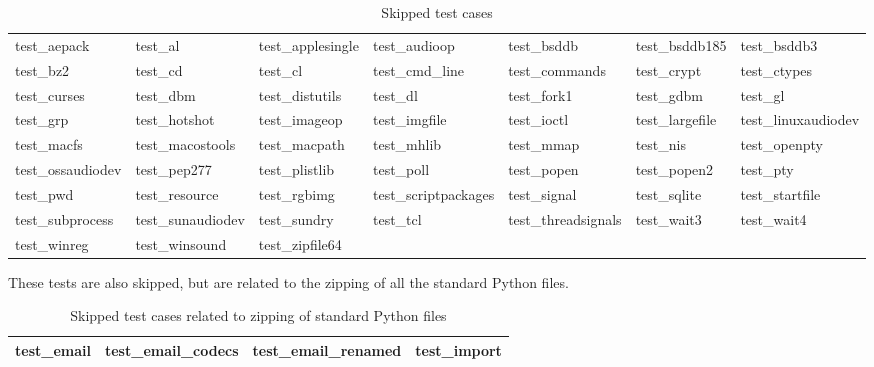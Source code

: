 \begin{table}[htbp]
\begin{center}
\begin{tabular}{l|l|l|l|l|l|l}
\hline
test_aepack & test_al & test_applesingle & test_audioop & test_bsddb & test_bsddb185 & test_bsddb3 \\
test_bz2 & test_cd & test_cl & test_cmd_line & test_commands & test_crypt & test_ctypes \\
test_curses & test_dbm & test_distutils & test_dl & test_fork1 & test_gdbm & test_gl \\
test_grp & test_hotshot & test_imageop & test_imgfile & test_ioctl & test_largefile & test_linuxaudiodev \\
test_macfs & test_macostools & test_macpath & test_mhlib & test_mmap & test_nis & test_openpty \\
test_ossaudiodev & test_pep277 & test_plistlib & test_poll & test_popen & test_popen2 & test_pty \\
test_pwd & test_resource & test_rgbimg & test_scriptpackages &test_signal & test_sqlite & test_startfile \\
test_subprocess & test_sunaudiodev & test_sundry & test_tcl & test_threadsignals & test_wait3 & test_wait4 \\
test_winreg & test_winsound & test_zipfile64 \\
\hline
\end{tabular}
\caption{Skipped test cases}
\label{tab:image2d}
\end{center}
\end{table}

These tests are also skipped, but are related to the zipping of all the standard Python files.

\begin{table}[htbp]
\begin{center}
\begin{tabular}{l|l|l|l}
\hline
test_email & test_email_codecs & test_email_renamed & test_import \\
\hline
\end{tabular}
\caption{Skipped test cases related to zipping of standard Python files}
\end{center}
\end{table}

